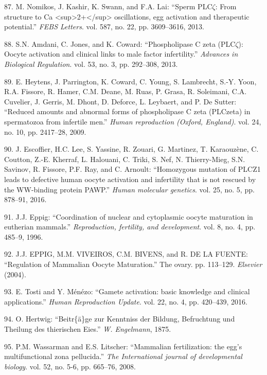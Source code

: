 \documentclass[12pt,a4paper,twoside]{ugathesis}
\theoremstyle{definition}
\theoremstyle{definition}
\theoremstyle{definition}
\theoremstyle{remark}
\begin{document}
\hypertarget{ref-Nomikos2013}{}
87. M. Nomikos, J. Kashir, K. Swann, and F.A. Lai: ``Sperm PLC\(\zeta\):
From structure to Ca
\textless{}sup\textgreater{}2+\textless{}/sup\textgreater{}
oscillations, egg activation and therapeutic potential.'' \emph{FEBS
Letters}. vol. 587, no. 22, pp. 3609--3616, 2013.

\hypertarget{ref-Amdani2013}{}
88. S.N. Amdani, C. Jones, and K. Coward: ``Phospholipase C zeta
(PLC\(\zeta\)): Oocyte activation and clinical links to male factor
infertility.'' \emph{Advances in Biological Regulation}. vol. 53, no. 3,
pp. 292--308, 2013.

\hypertarget{ref-Heytens2009}{}
89. E. Heytens, J. Parrington, K. Coward, C. Young, S. Lambrecht, S.-Y.
Yoon, R.A. Fissore, R. Hamer, C.M. Deane, M. Ruas, P. Grasa, R.
Soleimani, C.A. Cuvelier, J. Gerris, M. Dhont, D. Deforce, L. Leybaert,
and P. De Sutter: ``Reduced amounts and abnormal forms of phospholipase
C zeta (PLCzeta) in spermatozoa from infertile men.'' \emph{Human
reproduction (Oxford, England)}. vol. 24, no. 10, pp. 2417--28, 2009.

\hypertarget{ref-Escoffier2016}{}
90. J. Escoffier, H.C. Lee, S. Yassine, R. Zouari, G. Martinez, T.
Karaouzène, C. Coutton, Z.-E. Kherraf, L. Halouani, C. Triki, S. Nef, N.
Thierry-Mieg, S.N. Savinov, R. Fissore, P.F. Ray, and C. Arnoult:
``Homozygous mutation of PLCZ1 leads to defective human oocyte
activation and infertility that is not rescued by the WW-binding protein
PAWP.'' \emph{Human molecular genetics}. vol. 25, no. 5, pp. 878--91,
2016.

\hypertarget{ref-Eppig1996}{}
91. J.J. Eppig: ``Coordination of nuclear and cytoplasmic oocyte
maturation in eutherian mammals.'' \emph{Reproduction, fertility, and
development}. vol. 8, no. 4, pp. 485--9, 1996.

\hypertarget{ref-EPPIG2004}{}
92. J.J. EPPIG, M.M. VIVEIROS, C.M. BIVENS, and R. DE LA FUENTE:
``Regulation of Mammalian Oocyte Maturation.'' The ovary. pp. 113--129.
\emph{Elsevier} (2004).

\hypertarget{ref-Tosti2016}{}
93. E. Tosti and Y. Ménézo: ``Gamete activation: basic knowledge and
clinical applications.'' \emph{Human Reproduction Update}. vol. 22, no.
4, pp. 420--439, 2016.

\hypertarget{ref-hertwig1875beitrage}{}
94. O. Hertwig: ``Beitr\{ä\}ge zur Kenntniss der Bildung, Befruchtung
und Theilung des thierischen Eies.'' \emph{W. Engelmann}, 1875.

\hypertarget{ref-Wassarman2008}{}
95. P.M. Wassarman and E.S. Litscher: ``Mammalian fertilization: the
egg's multifunctional zona pellucida.'' \emph{The International journal
of developmental biology}. vol. 52, no. 5-6, pp. 665--76, 2008.
\end{document}
